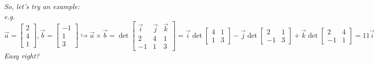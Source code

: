 \documentclass[addpoints]{exam}
\begin{document}
\textit{
So, let's try an example:\\
e.g.
\[
\vec{a}=
\begin{bmatrix}
    2\\4\\1
\end{bmatrix},
\vec{b}=
\begin{bmatrix}
    -1\\1\\3
\end{bmatrix} \hookrightarrow
\vec{a}\times\vec{b}=
\det\begin{bmatrix}
    \vec{i}&\vec{j}&\vec{k}\\
    2&4&1\\
    -1&1&3
\end{bmatrix} = 
\vec{i}\det\begin{bmatrix}
    4&1\\1&3
\end{bmatrix}-
\vec{j}\det\begin{bmatrix}
    2&1\\-1&3
\end{bmatrix}
+\vec{k}\det\begin{bmatrix}
    2&4\\-1&1
\end{bmatrix} = 
11\vec{i}-7\vec{j}+6\vec{k}=\begin{bmatrix}
    11\\-7\\6
\end{bmatrix}.
\]
Easy right?
}
\end{document}
